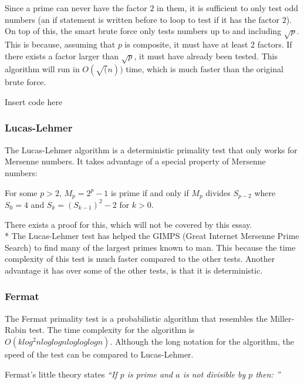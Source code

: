 \documentclass[main.tex]{subfiles}
\begin{document}
Since a prime can never have the factor $2$ in them, it is sufficient to
only test odd numbers (an if statement is written before to loop to test if it
has the factor $2$). On top of this, the smart brute force only
tests numbers up to and including $\sqrt{p}$. This is because, assuming that $p$
is composite, it must have at least 2 factors. If there exists a factor larger
than $\sqrt{p}$, it must have already been tested. This algorithm will run in
$O(\sqrt(n))$ time, which is much faster than the original brute force. \newline

\begin{python}
  Insert code here
\end{python}

\subsubsection{Lucas-Lehmer}
The Lucas-Lehmer algorithm is a deterministic primality test that only works for
Mersenne numbers. It takes advantage of a special property of Mersenne numbers:

\begin{mdframed}
  For some $p>2$, $M_p=2^p-1$ is prime if and only if $M_p$ divides $S_{p-2}$ where
  $S_0=4$ and $S_k=(S_{k-1})^2-2$ for $k>0$.
\end{mdframed}

There exists a proof for this, which will not be covered by this essay. \newline
\\*
The Lucas-Lehmer test has helped the GIMPS (Great Internet Mersenne Prime
Search) to find many of the largest primes known to man. This because the time
complexity of this test is much faster compared to the other tests. Another
advantage it has over some of the other tests, is that it is deterministic.

\subsubsection{Fermat}
The Fermat primality test \cite{algh:fermat} is a probabilistic algorithm that
resembles the Miller-Rabin test. The time complexity for the algorithm is $O(k
log^{2}n log log n log log log n)$. Although the long notation for the
algorithm, the speed of the test can be compared to Lucas-Lehmer.

Fermat's little theory \cite{fermat:little} states \textit{``If $p$ is prime and
  $a$ is not divisible by $p$ then: ''}
\end{document}
